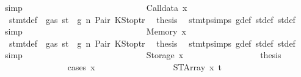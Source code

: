 \begin{isabellebody}
\ simp\isanewline
\ \ \ \ \ \ \ \ \ \ \ \ \isamarkupfalse%
\isanewline
\ \ \ \ \ \ \ \ \ \ \ \ \ \ \isamarkupfalse%
\ {\isacharparenleft}{\kern0pt}Calldata\ x{}{\isacharparenright}{\kern0pt}\isanewline
\ \ \ \ \ \ \ \ \ \ \ \ \ \ \isamarkupfalse%
\ {}{\isacharparenleft}{\kern0pt}{}{\isacharparenright}{\kern0pt}\ stmt{\isacharunderscore}{\kern0pt}def\ {\isacharbackquoteopen}{\isasymnot}\ gas\ st\ {\isasymle}\ g{\isacharbackquoteclose}\ n\ Pair\ KStoptr\ \isamarkupfalse%
\ {\isacharquery}{\kern0pt}thesis\ \isamarkupfalse%
\ stmt{\isachardot}{\kern0pt}psimps{\isacharparenleft}{\kern0pt}{}{\isacharparenright}{\kern0pt}\ g{\isacharunderscore}{\kern0pt}def\ st{\isacharprime}{\kern0pt}{\isacharunderscore}{\kern0pt}def\ st{\isacharprime}{\kern0pt}{\isacharprime}{\kern0pt}{\isacharunderscore}{\kern0pt}def\ \isamarkupfalse%
\ simp\isanewline
\ \ \ \ \ \ \ \ \ \ \ \ \isamarkupfalse%
\isanewline
\ \ \ \ \ \ \ \ \ \ \ \ \ \ \isamarkupfalse%
\ {\isacharparenleft}{\kern0pt}Memory\ x{}{\isacharparenright}{\kern0pt}\isanewline
\ \ \ \ \ \ \ \ \ \ \ \ \ \ \isamarkupfalse%
\ {}{\isacharparenleft}{\kern0pt}{}{\isacharparenright}{\kern0pt}\ stmt{\isacharunderscore}{\kern0pt}def\ {\isacharbackquoteopen}{\isasymnot}\ gas\ st\ {\isasymle}\ g{\isacharbackquoteclose}\ n\ Pair\ KStoptr\ \isamarkupfalse%
\ {\isacharquery}{\kern0pt}thesis\ \isamarkupfalse%
\ stmt{\isachardot}{\kern0pt}psimps{\isacharparenleft}{\kern0pt}{}{\isacharparenright}{\kern0pt}\ g{\isacharunderscore}{\kern0pt}def\ st{\isacharprime}{\kern0pt}{\isacharunderscore}{\kern0pt}def\ st{\isacharprime}{\kern0pt}{\isacharprime}{\kern0pt}{\isacharunderscore}{\kern0pt}def\ \isamarkupfalse%
\ simp\isanewline
\ \ \ \ \ \ \ \ \ \ \ \ \isamarkupfalse%
\isanewline
\ \ \ \ \ \ \ \ \ \ \ \ \ \ \isamarkupfalse%
\ {\isacharparenleft}{\kern0pt}Storage\ x{}{\isacharparenright}{\kern0pt}\isanewline
\ \ \ \ \ \ \ \ \ \ \ \ \ \ \isamarkupfalse%
\ \isamarkupfalse%
\ {\isacharquery}{\kern0pt}thesis\isanewline
\ \ \ \ \ \ \ \ \ \ \ \ \ \ \isamarkupfalse%
\ {\isacharparenleft}{\kern0pt}cases\ x{}{\isacharparenright}{\kern0pt}\isanewline
\ \ \ \ \ \ \ \ \ \ \ \ \ \ \ \ \isamarkupfalse%
\ {\isacharparenleft}{\kern0pt}STArray\ x\ t{\isacharparenright}{\kern0pt}\isanewline

\end{isabellebody}
